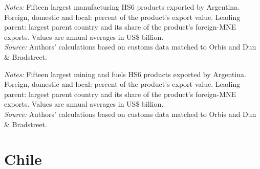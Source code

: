 \documentclass[11pt,a4paper]{article}
\begin{document}
\begin{table}[H]\centering\footnotesize%
  \caption{Argentina, Manufacturing: Fifteen Largest Export Products}%
  \label{tab:c_hs6_ARG_manufacturing}%
  \par\vspace{3pt}%
  \begin{minipage}{0.95\textwidth}\footnotesize %
  \textit{Notes:} Fifteen largest manufacturing HS6 products exported by Argentina. Foreign, domestic and local: percent of the product's export value. Leading parent: largest parent country and its share of the product's foreign-MNE exports. Values are annual averages in US\$ billion.\\[3pt]%
  \textit{Source:} Authors' calculations based on customs data matched to Orbis and Dun \& Bradstreet.%
  \end{minipage}%
  \end{table}
\begin{table}[H]\centering\footnotesize%
  \caption{Argentina, Mining and Fuels: Fifteen Largest Export Products}%
  \label{tab:c_hs6_ARG_mining}%
  \par\vspace{3pt}%
  \begin{minipage}{0.95\textwidth}\footnotesize %
  \textit{Notes:} Fifteen largest mining and fuels HS6 products exported by Argentina. Foreign, domestic and local: percent of the product's export value. Leading parent: largest parent country and its share of the product's foreign-MNE exports. Values are annual averages in US\$ billion.\\[3pt]%
  \textit{Source:} Authors' calculations based on customs data matched to Orbis and Dun \& Bradstreet.%
  \end{minipage}%
  \end{table}

\section{Chile}\label{sec:c_CHL}
\end{document}

